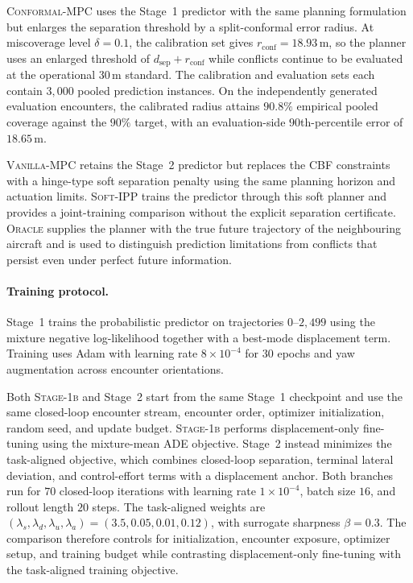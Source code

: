 \documentclass[11pt]{article}
\theoremstyle{plain}
\theoremstyle{definition}
\begin{document}
\textsc{Conformal-MPC} uses the Stage~1 predictor with the same
planning formulation but enlarges the separation threshold by a
split-conformal error radius. At miscoverage level $\delta=0.1$, the
calibration set gives $r_{\mathrm{conf}}=18.93$\,m, so the planner
uses an enlarged threshold of
$d_{\mathrm{sep}}+r_{\mathrm{conf}}$ while conflicts continue to be
evaluated at the operational $30$\,m standard. The calibration and
evaluation sets each contain $3{,}000$ pooled prediction instances.
On the independently generated evaluation encounters, the calibrated
radius attains $90.8\%$ empirical pooled coverage against the
$90\%$ target, with an evaluation-side $90$th-percentile error of
$18.65$\,m.

\textsc{Vanilla-MPC} retains the Stage~2 predictor but replaces the
CBF constraints with a hinge-type soft separation penalty using the
same planning horizon and actuation limits. \textsc{Soft-IPP} trains
the predictor through this soft planner and provides a joint-training
comparison without the explicit separation certificate.
\textsc{Oracle} supplies the planner with the true future trajectory
of the neighbouring aircraft and is used to distinguish prediction
limitations from conflicts that persist even under perfect future
information.

\paragraph{Training protocol.}
Stage~1 trains the probabilistic predictor on trajectories
$0$--$2{,}499$ using the mixture negative log-likelihood together
with a best-mode displacement term. Training uses Adam with learning
rate $8\times10^{-4}$ for $30$ epochs and yaw augmentation across
encounter orientations.

Both \textsc{Stage-1b} and Stage~2 start from the same Stage~1
checkpoint and use the same closed-loop encounter stream, encounter
order, optimizer initialization, random seed, and update budget.
\textsc{Stage-1b} performs displacement-only fine-tuning using the
mixture-mean ADE objective. Stage~2 instead minimizes the task-aligned
objective, which combines closed-loop separation, terminal lateral
deviation, and control-effort terms with a displacement anchor. Both branches
run for $70$ closed-loop iterations with learning rate
$1\times10^{-4}$, batch size $16$, and rollout length $20$ steps.
The task-aligned weights are
$(\lambda_s,\lambda_d,\lambda_u,\lambda_a)
=(3.5,0.05,0.01,0.12)$, with surrogate sharpness $\beta=0.3$.
The comparison therefore controls for initialization, encounter
exposure, optimizer setup, and training budget while contrasting
displacement-only fine-tuning with the task-aligned training
objective.
\end{document}
